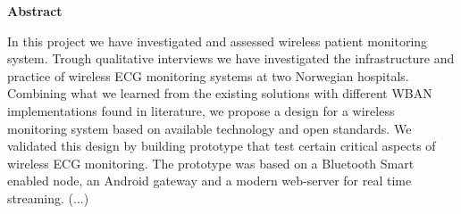 \begin{0_abstract}
	
\noindent \textbf{Abstract}
\newline	

\noindent
In this project we have investigated and assessed wireless patient monitoring system. Trough qualitative interviews we have investigated the infrastructure and practice of wireless ECG monitoring systems at two Norwegian hospitals. Combining what we learned from the existing solutions with different WBAN implementations found in literature, we propose a design for a wireless monitoring system based on available technology and open standards. We validated this design by building prototype that test certain critical aspects of wireless ECG monitoring. The prototype was based on a Bluetooth Smart enabled node, an Android gateway and a modern web-server for real time streaming. (...)

\end{0_abstract}